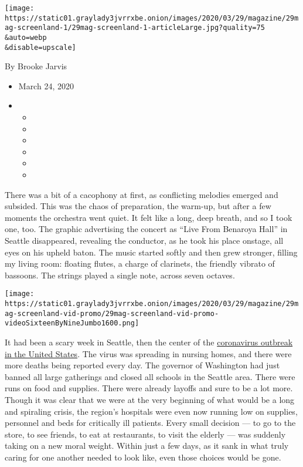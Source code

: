 \texttt{[image: https://static01.graylady3jvrrxbe.onion/images/2020/03/29/magazine/29mag-screenland-1/29mag-screenland-1-articleLarge.jpg?quality=75\\\&auto=webp\\\&disable=upscale]}

By Brooke Jarvis

\begin{itemize}
\item
  March 24, 2020
\item
  \begin{itemize}
  \item
  \item
  \item
  \item
  \item
  \item
  \end{itemize}
\end{itemize}

There was a bit of a cacophony at first, as conflicting melodies emerged
and subsided. This was the chaos of preparation, the warm-up, but after
a few moments the orchestra went quiet. It felt like a long, deep
breath, and so I took one, too. The graphic advertising the concert as
``Live From Benaroya Hall'' in Seattle disappeared, revealing the
conductor, as he took his place onstage, all eyes on his upheld baton.
The music started softly and then grew stronger, filling my living room:
floating flutes, a charge of clarinets, the friendly vibrato of
bassoons. The strings played a single note, across seven octaves.

\texttt{[image: https://static01.graylady3jvrrxbe.onion/images/2020/03/29/magazine/29mag-screenland-vid-promo/29mag-screenland-vid-promo-videoSixteenByNineJumbo1600.png]}

It had been a scary week in Seattle, then the center of the
\href{https://www.nytimes3xbfgragh.onion/news-event/coronavirus}{coronavirus
outbreak in the United States}. The virus was spreading in nursing
homes, and there were more deaths being reported every day. The governor
of Washington had just banned all large gatherings and closed all
schools in the Seattle area. There were runs on food and supplies. There
were already layoffs and sure to be a lot more. Though it was clear that
we were at the very beginning of what would be a long and spiraling
crisis, the region's hospitals were even now running low on supplies,
personnel and beds for critically ill patients. Every small decision ---
to go to the store, to see friends, to eat at restaurants, to visit the
elderly --- was suddenly taking on a new moral weight. Within just a few
days, as it sank in what truly caring for one another needed to look
like, even those choices would be gone.

